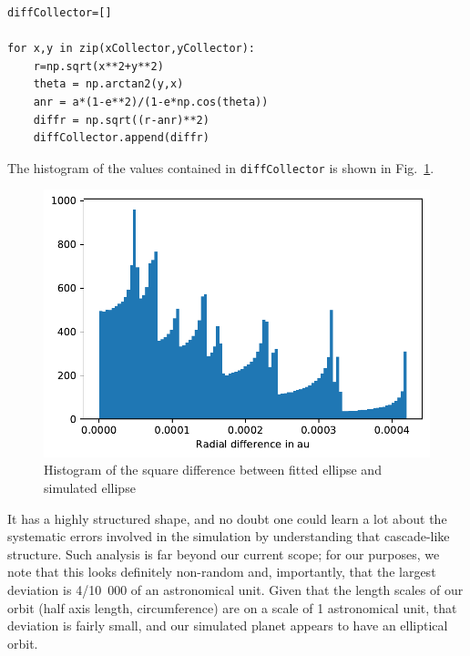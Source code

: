 \documentclass[twocolumn,apj]{openjournal}
\begin{document}
\begin{lstlisting}
diffCollector=[]

for x,y in zip(xCollector,yCollector):
    r=np.sqrt(x**2+y**2)
    theta = np.arctan2(y,x)
    anr = a*(1-e**2)/(1-e*np.cos(theta))
    diffr = np.sqrt((r-anr)**2)
    diffCollector.append(diffr)
\end{lstlisting}

The histogram of the values contained in \verb|diffCollector| is shown in Fig.~\ref{EllDiffHisto}.
\begin{figure}[htbp]
\begin{center}
\includegraphics[width=\linewidth]{ell-diff-histo.pdf}
\caption{Histogram of the square difference between fitted ellipse and simulated ellipse}
\label{EllDiffHisto}
\end{center}
\end{figure}
It has a highly structured shape, and no doubt one could learn a lot about the systematic errors involved in the simulation by understanding that cascade-like structure. Such analysis is far beyond our current scope; for our purposes, we note that this looks definitely non-random and, importantly, that the largest deviation is 4/10~000 of an astronomical unit. Given that the length scales of our orbit (half axis length, circumference) are on a scale of 1 astronomical unit, that deviation is fairly small, and our simulated planet appears to have an elliptical orbit.
\end{document}
